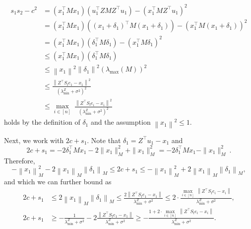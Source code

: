\documentclass[11pt]{article}
\theoremstyle{definition}
\theoremstyle{plain}
\newcommand{\Norm}[1]{\left\| #1 \right\|}
\providecommand{\norm}[1]{\Norm{#1}}
\begin{document}
\begin{align}
    s_1s_2 - c^2 &= \left(x^{\top}_1Mx_1\right)\left(u^{\top}_1ZMZ^{\top}u_1\right) - \left(x^{\top}_1MZ^{\top}u_1\right)^2 \\
    &= \left(x^{\top}_1Mx_1\right)\left((x_1 + \delta_1)^{\top}M(x_1 + \delta_1)\right) - \left(x^{\top}_1M(x_1 + \delta_1)\right)^2\\
    &= \left(x^{\top}_1Mx_1\right)\left(\delta_1^{\top}M\delta_1\right) - \left(x^{\top}_1M\delta_1\right)^2\\
    &\leq \left(x^{\top}_1Mx_1\right)\left(\delta_1^{\top}M\delta_1\right)\\
    &\leq \norm{x_1}^2\norm{\delta_1}^2\left(\lambda_{\max}(M)\right)^2\\
    &\leq \frac{\norm{Z^{\top}S_{\mathrm{f}}e_1 - x_1}^2}{\left(\lambda^{Z}_{\min} + \sigma^2\right)^2}\\
    &\leq \underset{i\in[n]}{\max} \ \frac{\norm{Z^{\top}S_{\mathrm{f}}e_i - x_i}^2}{\left(\lambda^{Z}_{\min} + \sigma^2\right)^2}
\end{align}
holds by the definition of $\delta_1$ and the assumption $\norm{x_1}^2 \leq 1$.

Next, we work with \(2c + s_{1}\).
Note that \(\delta_{1} = Z^{\top}u_{1} - x_{1}\) and 
\begin{equation*}
    2c + s_{1} = -2\delta_{1}^{\top}Mx_{1} - 2\|x_{1}\|^{2}_{M} + \|x_{1}\|^{2}_{M} = -2\delta_{1}^{\top}Mx_{1} - \|x_{1}\|^{2}_{M}~.
\end{equation*}
Therefore,
\begin{equation}
    -\norm{x_1}^2_M - 2\norm{x_1}_M \norm{\delta_1}_M \leq 2c+s_1 \leq -\norm{x_1}^2_M + 2\norm{x_1}_M \norm{\delta_1}_M,
\end{equation}
and which we can further bound as 
\begin{align}
    2c + s_1 &\leq 2\norm{x_1}_M\norm{\delta_1}_M \leq \frac{2\norm{Z^{\top}S_{\mathrm{f}}e_1 - x_1}}{\lambda^{Z}_{\min} + \sigma^2} \leq 2\cdot \frac{\underset{i\in[n]}{\max}\ \norm{Z^{\top}S_{\mathrm{f}}e_i - x_i}}{\lambda^{Z}_{\min} + \sigma^2}, \\ 
    2c + s_1 &\geq -\frac{1}{\lambda^{Z}_{\min} + \sigma^2} - 2\frac{\norm{Z^{\top}S_{\mathrm{f}}e_1 - x_1}}{\lambda^{Z}_{\min} + \sigma^2} \geq -\frac{1 + 2\cdot \underset{i\in[n]}{\max} \ \norm{Z^{\top}S_{\mathrm{f}}e_i - x_i}}{\lambda^{Z}_{\min} + \sigma^2}.
\end{align}
\end{document}
